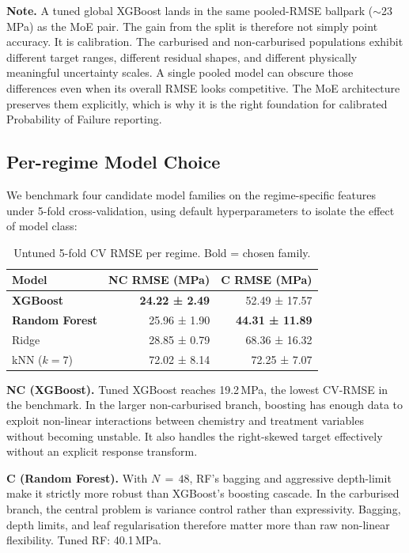 \documentclass[12pt,a4paper]{article} %
\begin{document}
\textbf{Note.} A tuned global XGBoost lands in the same pooled-RMSE ballpark
($\sim$23\,MPa) as the MoE pair. The gain from the split is therefore not simply point
accuracy. It is calibration. The carburised and non-carburised populations exhibit
different target ranges, different residual shapes, and different physically meaningful
uncertainty scales. A single pooled model can obscure those differences even when its
overall RMSE looks competitive. The MoE architecture preserves them explicitly, which is
why it is the right foundation for calibrated Probability of Failure reporting.

\subsection{Per-regime Model Choice}
We benchmark four candidate model families on the regime-specific features under
5-fold cross-validation, using default hyperparameters to isolate the effect of model
class:

\begin{table}[H]
\centering
\caption{Untuned 5-fold CV RMSE per regime. Bold = chosen family.}
\label{tab:benchmark}
\begin{tabular}{lrr}
\toprule
\textbf{Model} & \textbf{NC RMSE (MPa)} & \textbf{C RMSE (MPa)} \\
\midrule
\textbf{XGBoost} & \textbf{24.22 ± 2.49} & 52.49 ± 17.57 \\
\textbf{Random Forest} & 25.96 ± 1.90 & \textbf{44.31 ± 11.89} \\
Ridge            & 28.85 ± 0.79 & 68.36 ± 16.32 \\
kNN ($k=7$)      & 72.02 ± 8.14 & 72.25 ± 7.07 \\
\bottomrule
\end{tabular}
\end{table}

\textbf{NC (XGBoost).} Tuned XGBoost reaches 19.2\,MPa, the lowest CV-RMSE in the
benchmark. In the larger non-carburised branch, boosting has enough data to exploit
non-linear interactions between chemistry and treatment variables without becoming
unstable. It also handles the right-skewed target effectively without an explicit response
transform.

\textbf{C (Random Forest).} With $N\,{=}\,48$, RF's bagging and aggressive depth-limit make
it strictly more robust than XGBoost's boosting cascade. In the carburised branch, the
central problem is variance control rather than expressivity. Bagging, depth limits, and
leaf regularisation therefore matter more than raw non-linear flexibility. Tuned RF:
40.1\,MPa.
\end{document}
